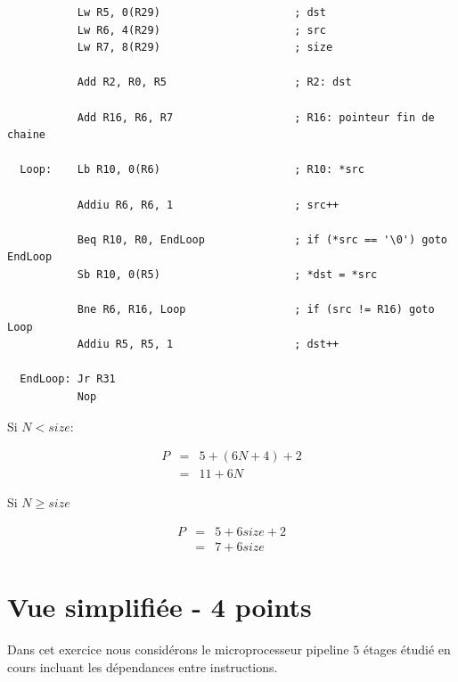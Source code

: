 \begin{correction}

  \begin{verbatim}
           Lw R5, 0(R29)                     ; dst
           Lw R6, 4(R29)                     ; src
           Lw R7, 8(R29)                     ; size

           Add R2, R0, R5                    ; R2: dst

           Add R16, R6, R7                   ; R16: pointeur fin de chaine

  Loop:    Lb R10, 0(R6)                     ; R10: *src

           Addiu R6, R6, 1                   ; src++

           Beq R10, R0, EndLoop              ; if (*src == '\0') goto EndLoop
           Sb R10, 0(R5)                     ; *dst = *src

           Bne R6, R16, Loop                 ; if (src != R16) goto Loop
           Addiu R5, R5, 1                   ; dst++

  EndLoop: Jr R31
           Nop
  \end{verbatim}

  Si $N < size$:

  \begin{center}
    \begin{eqnarray*}
      P & = & 5 + (6N + 4) + 2 \\
        & = & 11 + 6N
    \end{eqnarray*}
  \end{center}

  Si $N \geq size$

  \begin{center}
    \begin{eqnarray*}
      P & = & 5 + 6size + 2 \\
        & = & 7 + 6size
    \end{eqnarray*}
  \end{center}

\end{correction}

%
%

\section{Vue simplifi\'ee - 4 points}

Dans cet exercice nous consid\'erons le microprocesseur pipeline $5$ \'etages
\'etudi\'e en cours incluant les d\'ependances entre instructions.

